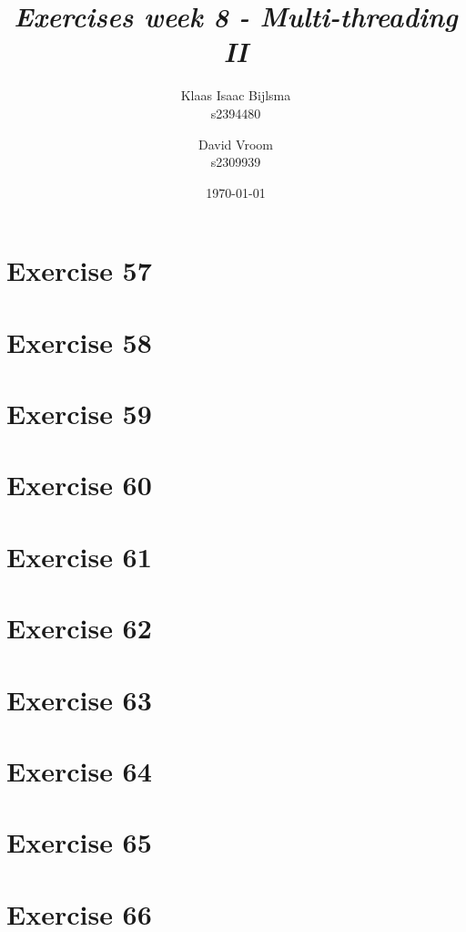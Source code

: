 \documentclass[12pt]{article}
\title{\itshape Exercises week 8 - Multi-threading II}
\author{
	Klaas Isaac Bijlsma \\ s2394480
	\and
	David Vroom \\ s2309939
}
\date{\today}
\newcommand{\desc}[1]{\textit{#1} \vspace{1em}}
\begin{document}
\maketitle

\section*{Exercise 57}
\desc{}

\clearpage

\section*{Exercise 58}
\desc{}

\clearpage

\section*{Exercise 59}
\desc{}

\clearpage

\section*{Exercise 60}
\desc{}

\clearpage

\section*{Exercise 61}
\desc{}

\clearpage

\section*{Exercise 62}
\desc{}

\clearpage

\section*{Exercise 63}
\desc{}

\clearpage

\section*{Exercise 64}
\desc{}

\clearpage

\section*{Exercise 65}
\desc{}

\clearpage

\section*{Exercise 66}
\desc{}

\clearpage
\end{document}
